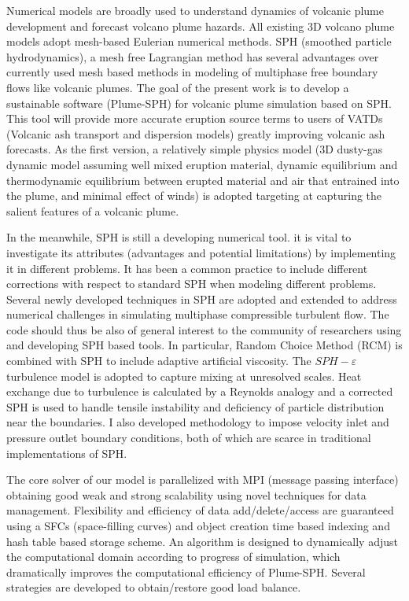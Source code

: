 Numerical models are broadly used to understand dynamics of volcanic plume development and forecast volcano plume hazards. All existing 3D volcano plume models adopt mesh-based Eulerian numerical methods. 
SPH (smoothed particle hydrodynamics), a mesh free Lagrangian method has several advantages over currently used mesh based methods in modeling of multiphase free boundary flows like volcanic plumes. The goal of the present work is to develop a sustainable software (Plume-SPH) for volcanic plume simulation based on SPH.
This tool will provide more accurate eruption source terms to users of VATDs (Volcanic ash transport and dispersion models) greatly improving volcanic ash forecasts.
As the first version, a relatively simple physics model (3D dusty-gas dynamic model assuming well mixed eruption material, dynamic equilibrium and thermodynamic equilibrium between erupted material and air that entrained into the plume, and minimal effect of winds) is adopted targeting at capturing the salient features of a volcanic plume. 
 
In the meanwhile, SPH is still a developing numerical tool. it is vital to investigate its attributes (advantages and potential limitations) by implementing it in different problems. It has been a common practice to include different corrections with respect to standard SPH when modeling different problems. Several newly developed techniques in SPH are adopted and extended to address numerical challenges in simulating multiphase compressible turbulent flow. The code should thus be also of general interest to the community of researchers using and developing SPH based tools. In particular, Random Choice Method (RCM) is combined with SPH to include adaptive artificial viscosity. The $SPH-\varepsilon$ turbulence model is adopted to capture mixing at unresolved scales. Heat exchange due to turbulence is calculated by a Reynolds analogy and a corrected SPH is used to handle tensile instability and deficiency of particle distribution near the boundaries. I also developed methodology to impose velocity inlet and pressure outlet boundary conditions, both of which are scarce in traditional implementations of SPH.

The core solver of our model is parallelized with MPI (message passing interface) obtaining good weak and strong scalability using novel techniques for data management. Flexibility and efficiency of data add/delete/access are guaranteed using a SFCs (space-filling curves) and object creation time based indexing and hash table based storage scheme. An algorithm is designed to dynamically adjust the computational domain according to progress of simulation, which dramatically improves the computational efficiency of Plume-SPH. Several strategies are developed to obtain/restore good load balance.

